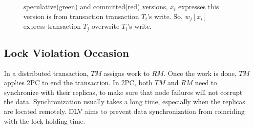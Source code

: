 \documentclass[conference]{IEEEtran}
\begin{document}
\begin{figure}[htbp]
{  }
  \caption{speculative(green) and committed(red) versions,
  ${x_i}$ expresses this version is from transaction transaction ${T_i}$'s write.
So, $w_j[x_i]$ express transaction ${T_j}$ overwrite ${T_i}$'s write.
}

\label{fig:versions_example}
\end{figure}

\subsection {Lock Violation Occasion}


In a distributed transaction, $TM$ assigns work to $RM$. Once the work is done, $TM$ applies 2PC to end the transaction.
In 2PC, both $TM$ and $RM$ need to synchronize with their replicas, to make sure that node failures will not corrupt the data.
Synchronization usually takes a long time, especially when the replicas are located remotely.
DLV aims to prevent data synchronization from coinciding with the lock holding time.
\end{document}
